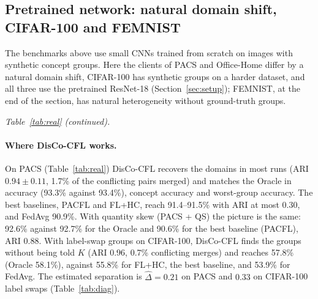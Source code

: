 \subsection{Pretrained network: natural domain shift, CIFAR-100 and FEMNIST}\label{sec:real}
The benchmarks above use small CNNs trained from scratch on images with synthetic concept groups. Here the clients of PACS and Office-Home differ by a natural domain shift, CIFAR-100 has synthetic groups on a harder dataset, and all three use the pretrained ResNet-18 (Section~\ref{sec:setup}); FEMNIST, at the end of the section, has natural heterogeneity without ground-truth groups.

\begin{tableorg}[!htbp]
\centering
\caption{PACS, PACS with quantity skew, Office-Home and CIFAR-100 (40 clients, 5 seeds; DisCo-T30: 3 seeds). Columns as in Table~\ref{tab:main}; IFCA, FeSEM, FL+HC, PACFL and FedDAG-C receive the true $K=4$. The last block repeats FEMNIST (Table~\ref{tab:real_femnist}); there ARI is computed against a single group and is not meaningful.}\label{tab:real}

\end{tableorg}

\begin{tableorg}[!htbp]
\centering
\noindent\textit{Table~\ref{tab:real} (continued).}\par\smallskip

\end{tableorg}

\paragraph{Where DisCo-CFL works.} On PACS (Table~\ref{tab:real}) DisCo-CFL recovers the domains in most runs (ARI $0.94\pm0.11$, 1.7\% of the conflicting pairs merged) and matches the Oracle in accuracy (93.3\% against 93.4\%), concept accuracy and worst-group accuracy. The best baselines, PACFL and FL+HC, reach 91.4--91.5\% with ARI at most $0.30$, and FedAvg 90.9\%. With quantity skew (PACS + QS) the picture is the same: 92.6\% against 92.7\% for the Oracle and 90.6\% for the best baseline (PACFL), ARI $0.88$. With label-swap groups on CIFAR-100, DisCo-CFL finds the groups without being told $K$ (ARI $0.96$, 0.7\% conflicting merges) and reaches 57.8\% (Oracle 58.1\%), against 55.8\% for FL+HC, the best baseline, and 53.9\% for FedAvg. The estimated separation is $\hat\Delta=0.21$ on PACS and $0.33$ on CIFAR-100 label swaps (Table~\ref{tab:diag}).

